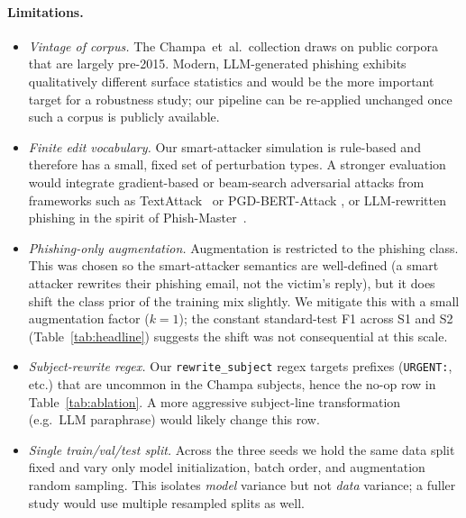 \documentclass[conference]{IEEEtran}
\begin{document}
\paragraph{Limitations.}
\begin{itemize}
  \item \emph{Vintage of corpus.} The Champa~et~al.\ collection draws on
        public corpora that are largely pre-2015. Modern, LLM-generated
        phishing exhibits qualitatively different surface statistics
        \cite{kim2025llms,phishmaster2025} and would be the more important
        target for a robustness study; our pipeline can be re-applied
        unchanged once such a corpus is publicly available.
  \item \emph{Finite edit vocabulary.} Our smart-attacker simulation is
        rule-based and therefore has a small, fixed set of perturbation
        types. A stronger evaluation would integrate gradient-based or
        beam-search adversarial attacks from frameworks such as
        TextAttack~\cite{textattack2020} or PGD-BERT-Attack
        \cite{pgdbertattack2024}, or LLM-rewritten phishing in the spirit
        of Phish-Master~\cite{phishmaster2025}.
  \item \emph{Phishing-only augmentation.} Augmentation is restricted to
        the phishing class. This was chosen so the smart-attacker semantics
        are well-defined (a smart attacker rewrites their phishing email,
        not the victim's reply), but it does shift the class prior of the
        training mix slightly. We mitigate this with a small augmentation
        factor ($k\!=\!1$); the constant standard-test F1 across S1 and
        S2 (Table~\ref{tab:headline}) suggests the shift was not
        consequential at this scale.
  \item \emph{Subject-rewrite regex.} Our \texttt{rewrite\_subject} regex
        targets prefixes (\texttt{URGENT:}, etc.) that are uncommon in the
        Champa subjects, hence the no-op row in
        Table~\ref{tab:ablation}. A more aggressive subject-line
        transformation (e.g.\ LLM paraphrase) would likely change this row.
  \item \emph{Single train/val/test split.} Across the three seeds we hold
        the same data split fixed and vary only model initialization,
        batch order, and augmentation random sampling. This isolates
        \emph{model} variance but not \emph{data} variance; a fuller study
        would use multiple resampled splits as well.
\end{itemize}
\end{document}
